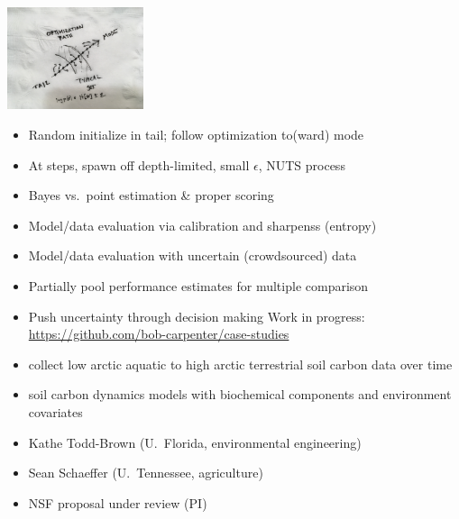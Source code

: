 \documentclass[10pt]{report}
\begin{document}
\begin{center}
\includegraphics[width=0.3\textwidth]{img/napkin-adapt.jpg}
\end{center}
\begin{itemize}
\item Random initialize in tail; follow optimization to(ward) mode
\item At steps, spawn off depth-limited, small $\epsilon$, NUTS process
\end{itemize}

\begin{itemize}
\item Bayes vs.\ point estimation \& proper scoring
\item Model/data evaluation via calibration and sharpenss (entropy)
\item Model/data evaluation with uncertain (crowdsourced) data
\item Partially pool performance estimates for multiple comparison
\item Push uncertainty through decision making
\vfill
\noindent
{\footnotesize Work in progress: \url{https://github.com/bob-carpenter/case-studies}}
\end{itemize}

\begin{itemize}
\item collect low arctic aquatic to high arctic terrestrial soil carbon data over time
\item soil carbon dynamics models with biochemical components and environment covariates
\item Kathe Todd-Brown (U.\ Florida, environmental engineering)
\item Sean Schaeffer (U.\ Tennessee, agriculture)
\vfill
\item {\footnotesize NSF proposal under review (PI)}
\end{itemize}
\end{document}
